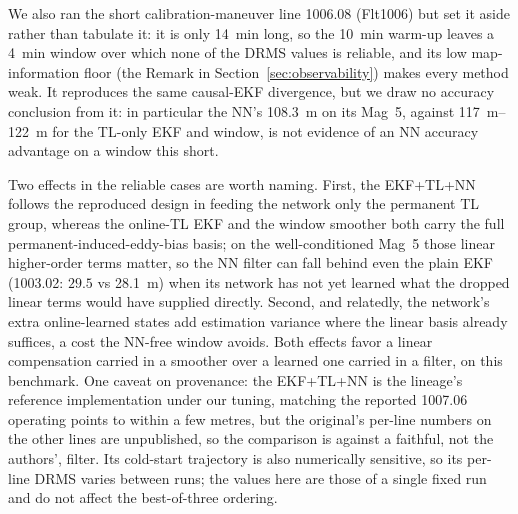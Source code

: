 \documentclass{IEEEtaes}
\begin{document}
We also ran the short calibration-maneuver line 1006.08 (Flt1006) but set it aside
rather than tabulate it: it is only \SI{14}{\minute} long, so the \SI{10}{\minute}
warm-up leaves a \SI{4}{\minute} window over which none of the DRMS values is
reliable, and its low map-information floor (the Remark in
Section~\ref{sec:observability}) makes every method weak. It reproduces the same causal-EKF divergence, but we draw no
accuracy conclusion from it: in particular the NN's \SI{108.3}{\meter} on its Mag~5,
against \SIrange{117}{122}{\meter} for the TL-only EKF and window, is not evidence of
an NN accuracy advantage on a window this short.

Two effects in the reliable cases are worth naming. First, the EKF+TL+NN follows
the reproduced design in feeding the network only the permanent TL group,
whereas the online-TL EKF and the window smoother both carry the full
permanent-induced-eddy-bias basis; on the well-conditioned Mag~5 those linear
higher-order terms matter, so the NN filter can fall behind even the plain
EKF (1003.02: $29.5$ vs \SI{28.1}{\meter}) when its network has not yet learned
what the dropped linear terms would have supplied directly. Second, and relatedly,
the network's extra online-learned states add estimation variance where the linear
basis already suffices, a cost the NN-free window avoids. Both effects favor a
linear compensation carried in a smoother over a learned one carried in a filter,
on this benchmark. One caveat on provenance: the EKF+TL+NN is the lineage's
reference implementation under our tuning, matching the reported 1007.06 operating
points to within a few metres, but the original's per-line numbers on the other
lines are unpublished, so the comparison is against a faithful, not the
authors', filter. Its cold-start trajectory is also numerically sensitive, so its
per-line DRMS varies between runs; the values here are those of a single fixed run
and do not affect the best-of-three ordering.
\end{document}
